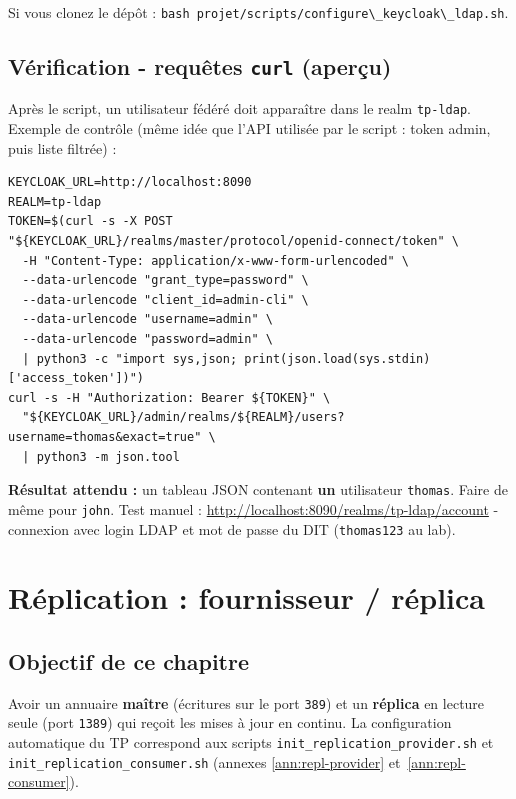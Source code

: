 \documentclass[11pt,a4paper]{report}
\newcommand{\bash}[1]{\lstinline[style=bashstyle, basicstyle=\ttfamily]{#1}}
\begin{document}
Si vous clonez le dépôt : \bash{bash projet/scripts/configure\_keycloak\_ldap.sh}.

\section{Vérification - requêtes \texttt{curl} (aperçu)}

Après le script, un utilisateur fédéré doit apparaître dans le realm \texttt{tp-ldap}. Exemple de contrôle (même idée que l'API utilisée par le script : token admin, puis liste filtrée) :

\begin{lstlisting}[style=bashstyle]
KEYCLOAK_URL=http://localhost:8090
REALM=tp-ldap
TOKEN=$(curl -s -X POST "${KEYCLOAK_URL}/realms/master/protocol/openid-connect/token" \
  -H "Content-Type: application/x-www-form-urlencoded" \
  --data-urlencode "grant_type=password" \
  --data-urlencode "client_id=admin-cli" \
  --data-urlencode "username=admin" \
  --data-urlencode "password=admin" \
  | python3 -c "import sys,json; print(json.load(sys.stdin)['access_token'])")
curl -s -H "Authorization: Bearer ${TOKEN}" \
  "${KEYCLOAK_URL}/admin/realms/${REALM}/users?username=thomas&exact=true" \
  | python3 -m json.tool
\end{lstlisting}

\textbf{Résultat attendu :} un tableau JSON contenant \textbf{un} utilisateur \texttt{thomas}. Faire de même pour \texttt{john}. Test manuel : \url{http://localhost:8090/realms/tp-ldap/account} - connexion avec login LDAP et mot de passe du DIT (\texttt{thomas123} au lab).

\chapter{Réplication : fournisseur / réplica}

\section{Objectif de ce chapitre}

Avoir un annuaire \textbf{maître} (écritures sur le port \texttt{389}) et un \textbf{réplica} en lecture seule (port \texttt{1389}) qui reçoit les mises à jour en continu. La configuration automatique du TP correspond aux scripts \texttt{init\_replication\_provider.sh} et \texttt{init\_replication\_consumer.sh} (annexes \ref{ann:repl-provider} et~\ref{ann:repl-consumer}).
\end{document}
